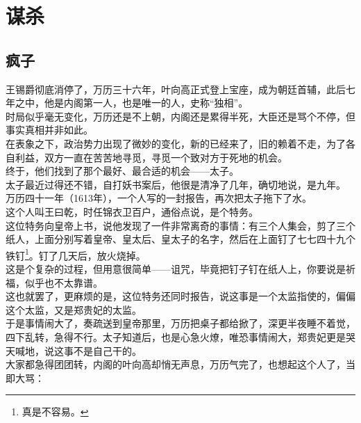 \section{谋杀}
\ifnum{}
	\begin{multicols}{\theparacolNo}
\fi
\subsection{疯子}
王锡爵彻底消停了，万历三十六年，叶向高正式登上宝座，成为朝廷首辅，此后七年之中，他是内阁第一人，也是唯一的人，史称“独相”。\\

时局似乎毫无变化，万历还是不上朝，内阁还是累得半死，大臣还是骂个不停，但事实真相并非如此。\\

在表象之下，政治势力出现了微妙的变化，新的已经来了，旧的赖着不走，为了各自利益，双方一直在苦苦地寻觅，寻觅一个致对方于死地的机会。\\

终于，他们找到了那个最好、最合适的机会——太子。\\

太子最近过得还不错，自打妖书案后，他很是清净了几年，确切地说，是九年。\\

万历四十一年（1613年），一个人写的一封报告，再次把太子拖下了水。\\

这个人叫王曰乾，时任锦衣卫百户，通俗点说，是个特务。\\

这位特务向皇帝上书，说他发现了一件非常离奇的事情：有三个人集会，剪了三个纸人，上面分别写着皇帝、皇太后、皇太子的名字，然后在上面钉了七七四十九个铁钉\footnote{真是不容易。}。钉了几天后，放火烧掉。\\

这是个复杂的过程，但用意很简单——诅咒，毕竟把钉子钉在纸人上，你要说是祈福，似乎也不太靠谱。\\

这也就罢了，更麻烦的是，这位特务还同时报告，说这事是一个太监指使的，偏偏这个太监，又是郑贵妃的太监。\\

于是事情闹大了，奏疏送到皇帝那里，万历把桌子都给掀了，深更半夜睡不着觉，四下乱转，急得不行。太子知道后，也是心急火燎，唯恐事情闹大，郑贵妃更是哭天喊地，说这事不是自己干的。\\

大家都急得团团转，内阁的叶向高却悄无声息，万历气完了，也想起这个人了，当即大骂：\\


\end{multicols}
